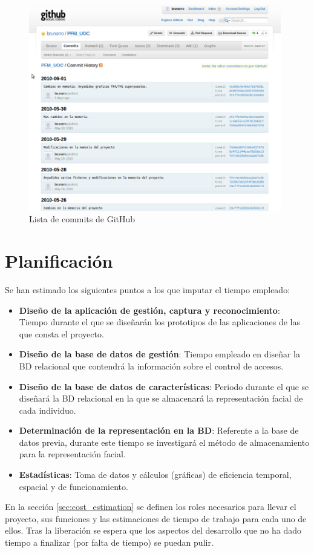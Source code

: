 \begin{figure}
	\centering
	\includegraphics[width=11cm]{imagenes/interfazGit.png}
	\caption{Lista de commits de GitHub}
	\label{fig:interface_git}
\end{figure}


\section{Planificación}
Se han estimado los siguientes puntos a los que imputar el tiempo empleado:
\begin{itemize}
	\item{\textbf{Diseño de la aplicación de gestión, captura y reconocimiento}: Tiempo durante el que se diseñarán los prototipos de las aplicaciones de las que consta el proyecto.}
	\item{\textbf{Diseño de la base de datos de gestión}: Tiempo empleado en diseñar la BD relacional que contendrá la información sobre el control de accesos.}
	\item{\textbf{Diseño de la base de datos de características}: Periodo durante el que se diseñará la BD relacional en la que se almacenará la representación facial de cada individuo.}
	\item{\textbf{Determinación de la representación en la BD}: Referente a la base de datos previa, durante este tiempo se investigará el método de almacenamiento para la representación facial.}
	\item{\textbf{Estadísticas}: Toma de datos y cálculos (gráficas) de eficiencia temporal, espacial y de funcionamiento.}
\end{itemize}
En la sección \ref{sec:cost_estimation} se definen los roles necesarios para llevar el proyecto, sus funciones y las estimaciones de tiempo de trabajo para cada uno de ellos. Tras la liberación se espera que los aspectos del desarrollo que no ha dado tiempo a finalizar (por falta de tiempo) se puedan pulir.
